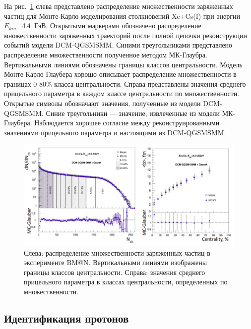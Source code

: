 На рис.~\ref{fig:bmn_multiplicity} слева представлено распределение множественности заряженных частиц для Монте-Карло моделирования столкновений Xe+Cs(I) при энергии $E_{kin}$=4$A$~ГэВ.
Открытыми маркерами обозначено распределение множественности заряженных траекторий после полной цепочки реконструкции событий модели DCM-QGSMSMM.
Синими треугольниками представлено распределение множественности полученное методом МК-Глаубра.
Вертикальными линиями обозначены границы классов центральности.
Модель Монте-Карло Глаубера хорошо описывает распределение множественности в границах 0-80\% класса центральности.
Справа представлены значения среднего прицельного параметра в каждом классе центральности по множественности.
Открытые символы обозначают значения, полученные из модели DCM-QGSMSMM.
Синие треугольники --- значение, извлеченные из модели МК-Глаубера.
Наблюдается хорошее согласие между реконструированными значениями прицельного параметра и настоящими из DCM-QGSMSMM.
%
\begin{figure}[ht]
\begin{center}
\includegraphics[width=0.95\linewidth]{images/mc_glauber_xecs_mult.png}
\caption{Слева: распределение множественности заряженных частиц в эксперименте BM@N. Вертикальными линиями изображены границы классов центральности. Справа: значения среднего прицельного параметра в классах центральности, определенных по множественности.}
\label{fig:bmn_multiplicity}
\end{center}
\end{figure}

\subsection{Идентификация протонов}

